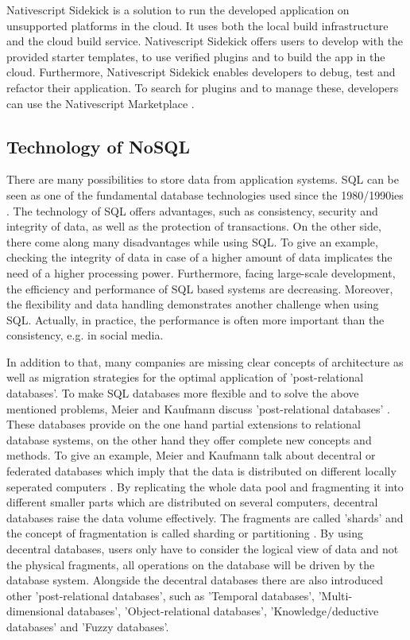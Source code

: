 Nativescript Sidekick is a solution to run the developed application on unsupported platforms in the cloud. It uses both the local build infrastructure and the cloud build service. Nativescript Sidekick offers users to develop with the provided starter templates, to use verified plugins and to build the app in the cloud. Furthermore, Nativescript Sidekick enables developers to debug, test and refactor their application. 
To search for plugins and to manage these, developers can use the Nativescript Marketplace \cite{nsmarket}.

\subsection{Technology of NoSQL} \label{nosql}

There are many possibilities to store data from application systems. \ac{SQL} can be seen as one of the fundamental database technologies used since the 1980/1990ies \cite[p.137 ff.]{nosql_meier}. The technology of SQL offers advantages, such as consistency, security and integrity of data, as well as the protection of transactions. On the other side, there come along many disadvantages while using SQL. To give an example, checking the integrity of data in case of a higher amount of data implicates the need of a higher processing power. Furthermore, facing large-scale development, the efficiency and performance of SQL based systems are decreasing. Moreover, the flexibility and data handling demonstrates another challenge when using SQL. Actually, in practice, the performance is often more important than the consistency, e.g. in social media.    

In addition to that, many companies are missing clear concepts of architecture as well as migration strategies for the optimal application of  'post-relational databases'. To make SQL databases more flexible and to solve the above mentioned problems, Meier and Kaufmann discuss 'post-relational databases' \cite[p.187 ff.]{nosql_meier}. These databases provide on the one hand partial extensions to relational database systems, on the other hand they offer complete new concepts and methods. To give an example, Meier and Kaufmann talk about decentral or federated databases which imply that the data is distributed on different locally seperated computers \cite[p.188 ff.]{nosql_meier}. By replicating the whole data pool and fragmenting it into different smaller parts which are distributed on several computers, decentral databases raise the data volume effectively. The fragments are called 'shards' and the concept of fragmentation is called sharding or partitioning \cite[p.188 ff.]{nosql_meier}. By using decentral databases, users only have to consider the logical view of data and not the physical fragments, all operations on the database will be driven by the database system.  
Alongside the decentral databases there are also introduced other 'post-relational databases', such as 'Temporal databases', 'Multi-dimensional databases', 'Object-relational databases', 'Knowledge/deductive databases' and 'Fuzzy databases'.

